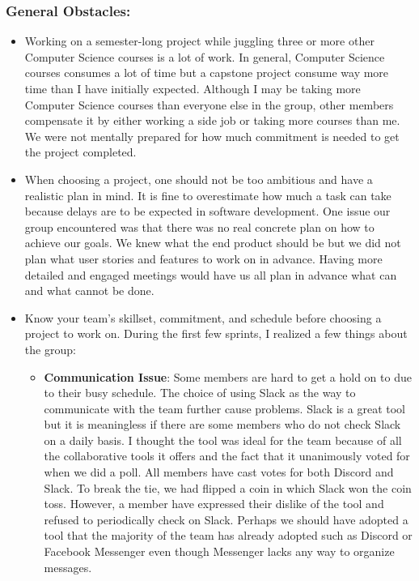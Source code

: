 \documentclass[letterpaper,twocolumn,10pt]{article}
\begin{document}
{{\subsubsection{General Obstacles:}
\begin{itemize}[noitemsep]
\item Working on a semester-long project while juggling three or more other Computer Science courses is a lot of work. In general, Computer Science courses consumes a lot of time but a capstone project consume way more time than I have initially expected. Although I may be taking more Computer Science courses than everyone else in the group, other members compensate it by either working a side job or taking more courses than me. We were not mentally prepared for how much commitment is needed to get the project completed.

\item When choosing a project, one should not be too ambitious and have a realistic plan in mind. It is fine to overestimate how much a task can take because delays are to be expected in software development. One issue our group encountered was that there was no real concrete plan on how to achieve our goals. We knew what the end product should be but we did not plan what user stories and features to work on in advance. Having more detailed and engaged meetings would have us all plan in advance what can and what cannot be done.  

\item Know your team's skillset, commitment, and schedule before choosing a project to work on. During the first few sprints, I realized a few things about the group:
\begin{itemize}[noitemsep]
\item \textbf{Communication Issue}: Some members are hard to get a hold on to due to their busy schedule. The choice of using Slack as the way to communicate with the team further cause problems. Slack is a great tool but it is meaningless if there are some members who do not check Slack on a daily basis. I thought the tool was ideal for the team because of all the collaborative tools it offers and the fact that it unanimously voted for when we did a poll. All members have cast votes for both Discord and Slack. To break the tie, we had flipped a coin in which Slack won the coin toss. However, a member have expressed their dislike of the tool and refused to periodically check on Slack. Perhaps we should have adopted a tool that the majority of the team has already adopted such as Discord or Facebook Messenger even though Messenger lacks any way to organize messages.


\end{itemize}
\end{itemize}}}
\end{document}
